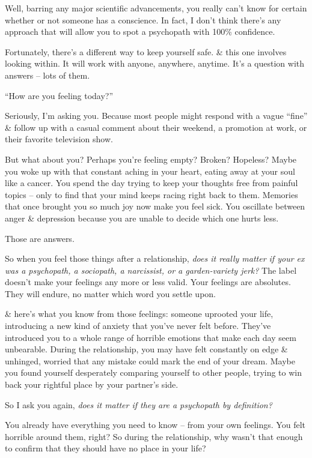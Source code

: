 \documentclass{article}
\numberwithin{equation}{section}
\begin{document}
Well, barring any major scientific advancements, you really can't know for certain whether or not someone has a conscience. In fact, I don't think there's any approach that will allow you to spot a psychopath with 100\% confidence.

Fortunately, there's a different way to keep yourself safe. \& this one involves looking within. It will work with anyone, anywhere, anytime. It's a question with answers -- lots of them.

``How are you feeling today?''

Seriously, I'm asking you. Because most people might respond with a vague ``fine'' \& follow up with a casual comment about their weekend, a promotion at work, or their favorite television show.

But what about you? Perhaps you're feeling empty? Broken? Hopeless? Maybe you woke up with that constant aching in your heart, eating away at your soul like a cancer. You spend the day trying to keep your thoughts free from painful topics -- only to find that your mind keeps racing right back to them. Memories that once brought you so much joy now make you feel sick. You oscillate between anger \& depression because you are unable to decide which one hurts less.

Those are answers.

So when you feel those things after a relationship, \textit{does it really matter if your ex was a psychopath, a sociopath, a narcissist, or a garden-variety jerk?} The label doesn't make your feelings any more or less valid. Your feelings are absolutes. They will endure, no matter which word you settle upon.

\& here's what you know from those feelings: someone uprooted your life, introducing a new kind of anxiety that you've never felt before. They've introduced you to a whole range of horrible emotions that make each day seem unbearable. During the relationship, you may have felt constantly on edge \& unhinged, worried that any mistake could mark the end of your dream. Maybe you found yourself desperately comparing yourself to other people, trying to win back your rightful place by your partner's side.

So I ask you again, \textit{does it matter if they are a psychopath by definition?}

You already have everything you need to know -- from your own feelings. You felt horrible around them, right? So during the relationship, why wasn't that enough to confirm that they should have no place in your life?
\end{document}
